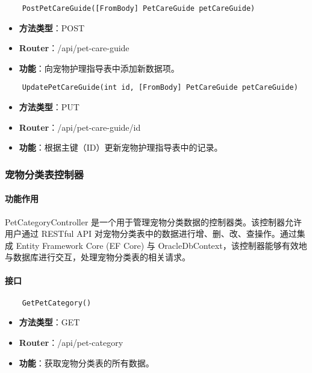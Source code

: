 \begin{verbatim}
	PostPetCareGuide([FromBody] PetCareGuide petCareGuide)
\end{verbatim}

\begin{itemize}
	\item \textbf{方法类型}：POST
	\item \textbf{Router}：/api/pet-care-guide
	\item \textbf{功能}：向宠物护理指导表中添加新数据项。
\end{itemize}

\begin{verbatim}
	UpdatePetCareGuide(int id, [FromBody] PetCareGuide petCareGuide)
\end{verbatim}

\begin{itemize}
	\item \textbf{方法类型}：PUT
	\item \textbf{Router}：/api/pet-care-guide/{id}
	\item \textbf{功能}：根据主键（ID）更新宠物护理指导表中的记录。
\end{itemize}

\subsubsection{宠物分类表控制器}

\paragraph{功能作用}

PetCategoryController 是一个用于管理宠物分类数据的控制器类。该控制器允许用户通过 RESTful API 对宠物分类表中的数据进行增、删、改、查操作。通过集成 Entity Framework Core (EF Core) 与 OracleDbContext，该控制器能够有效地与数据库进行交互，处理宠物分类表的相关请求。

\paragraph{接口}

\begin{verbatim}
	GetPetCategory()
\end{verbatim}

\begin{itemize}
	\item \textbf{方法类型}：GET
	\item \textbf{Router}：/api/pet-category
	\item \textbf{功能}：获取宠物分类表的所有数据。
\end{itemize}

